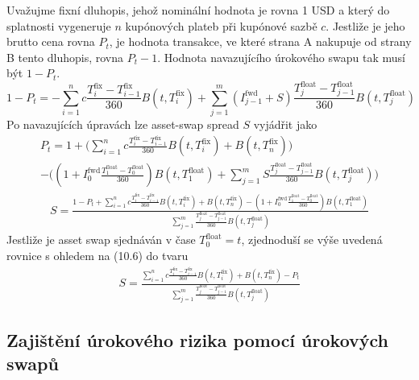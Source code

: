 \documentclass[a4paper]{book}
\begin{document}
Uvažujme fixní dluhopis, jehož nominální hodnota je rovna 1 USD a který do splatnosti vygeneruje $n$ kupónových plateb při kupónové sazbě $c$. Jestliže je jeho brutto cena rovna $P_t$, je hodnota transakce, ve které strana A nakupuje od strany B tento dluhopis, rovna $P_t - 1$. Hodnota navazujícího úrokového swapu tak musí být $1 - P_t$.
\begin{equation*}
1 - P_t = - \sum_{i=1}^n c \frac{T_i^{\mathrm{fix}}-T_{i-1}^{\mathrm{fix}}}{360}B(t,T_i^{\mathrm{fix}}) + \sum_{j=1}^m (I_{j-1}^{\mathrm{fwd}} + S) \frac{T_j^{\mathrm{float}}-T_{j-1}^{\mathrm{float}}}{360}B(t,T_j^{\mathrm{float}})
\end{equation*}
Po navazujících úpravách lze asset-swap spread $S$ vyjádřit jako
\begin{equation*}
\begin{split}
P_t = 1 + \Bigg( \sum_{i=1}^n c \frac{T_i^{\mathrm{fix}}-T_{i-1}^{\mathrm{fix}}}{360}B(t,T_i^{\mathrm{fix}}) + B(t, T_n^{\mathrm{fix}}) \Bigg)\\
 - \Bigg( (1 + I_0^{\mathrm{fwd}}\frac{T_1^{\mathrm{float}} - T_0^{\mathrm{float}}}{360})B(t,T_1^{\mathrm{float}}) + \sum_{j=1}^m S \frac{T_j^{\mathrm{float}}-T_{j-1}^{\mathrm{float}}}{360}B(t,T_j^{\mathrm{float}}) \Bigg)
\end{split}
\end{equation*}
\begin{equation*}
\begin{split}
S = \frac{1 - P_t + \sum_{i=1}^n c \frac{T_i^{\mathrm{fix}}-T_{i-1}^{\mathrm{fix}}}{360}B(t,T_i^{\mathrm{fix}}) + B(t, T_n^{\mathrm{fix}}) - (1 + I_0^{\mathrm{fwd}}\frac{T_1^{\mathrm{float}} - T_0^{\mathrm{float}}}{360})B(t,T_1^{\mathrm{float}})}{\sum_{j=1}^m \frac{T_j^{\mathrm{float}}-T_{j-1}^{\mathrm{float}}}{360}B(t,T_j^{\mathrm{float}})}
\end{split}
\end{equation*}
Jestliže je asset swap sjednáván v čase $T_0^{\mathrm{float}} = t$, zjednoduší se výše uvedená rovnice s ohledem na (10.6) do tvaru
\begin{equation*}
\begin{split}
S = \frac{\sum_{i=1}^n c \frac{T_i^{\mathrm{fix}}-T_{i-1}^{\mathrm{fix}}}{360}B(t,T_i^{\mathrm{fix}}) + B(t, T_n^{\mathrm{fix}}) - P_t}{\sum_{j=1}^m \frac{T_j^{\mathrm{float}}-T_{j-1}^{\mathrm{float}}}{360}B(t,T_j^{\mathrm{float}})}
\end{split}
\end{equation*}

\subsection{Zajištění úrokového rizika pomocí úrokových swapů}
\end{document}
